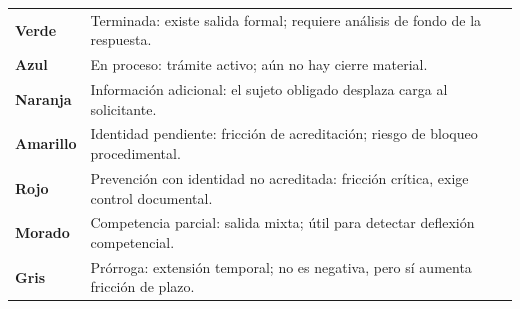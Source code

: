 \documentclass[10pt,letterpaper]{article}
\begin{document}
\begin{landscape}
\vspace{0.4cm}
\begin{tcolorbox}[colback=white,colframe=GrisTecnico,title={Leyenda cromática},fonttitle=\bfseries]
\begin{tabular}{>{\bfseries}p{4.5cm}p{17cm}}
Verde & Terminada: existe salida formal; requiere análisis de fondo de la respuesta.\\
Azul & En proceso: trámite activo; aún no hay cierre material.\\
Naranja & Información adicional: el sujeto obligado desplaza carga al solicitante.\\
Amarillo & Identidad pendiente: fricción de acreditación; riesgo de bloqueo procedimental.\\
Rojo & Prevención con identidad no acreditada: fricción crítica, exige control documental.\\
Morado & Competencia parcial: salida mixta; útil para detectar deflexión competencial.\\
Gris & Prórroga: extensión temporal; no es negativa, pero sí aumenta fricción de plazo.
\end{tabular}
\end{tcolorbox}
\end{landscape}
\clearpage
\end{document}
